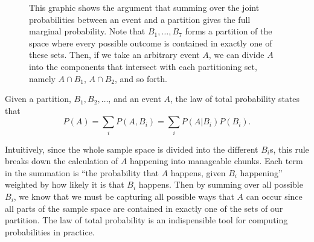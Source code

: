 \documentclass[
  letterpaper,
  DIV=11,
  numbers=noendperiod]{scrreprt}
\theoremstyle{definition}
\theoremstyle{definition}
\theoremstyle{definition}
\theoremstyle{remark}
\begin{document}
\begin{figure}[H]

\caption{\label{fig-basic-partition}This graphic shows the argument that
summing over the joint probabilities between an event and a partition
gives the full marginal probability. Note that \(B_1,\dots,B_7\) forms a
partition of the space where every possible outcome is contained in
exactly one of these sets. Then, if we take an arbitrary event \(A\), we
can divide \(A\) into the components that intersect with each
partitioning set, namely \(A \cap B_1\), \(A \cap B_2\), and so forth.}


\end{figure}%

\begin{tcolorbox}[enhanced jigsaw, rightrule=.15mm, leftrule=.75mm, opacitybacktitle=0.6, title={The Law of Total Probability}, colframe=quarto-callout-tip-color-frame, opacityback=0, coltitle=black, breakable, toptitle=1mm, colbacktitle=quarto-callout-tip-color!10!white, bottomtitle=1mm, titlerule=0mm, arc=.35mm, colback=white, toprule=.15mm, left=2mm, bottomrule=.15mm]

Given a partition, \(B_1, B_2, \dots\), and an event \(A\), the law of
total probability states that
\[P(A) = \sum_i P(A, B_i) = \sum_i P(A|B_i)P(B_i).\]

\end{tcolorbox}

Intuitively, since the whole sample space is divided into the different
\(B_i\)s, this rule breaks down the calculation of \(A\) happening into
manageable chunks. Each term in the summation is ``the probability that
\(A\) happens, given \(B_i\) happening'' weighted by how likely it is
that \(B_i\) happens. Then by summing over all possible \(B_i\), we know
that we must be capturing all possible ways that \(A\) can occur since
all parts of the sample space are contained in exactly one of the sets
of our partition. The law of total probability is an indispensible tool
for computing probabilities in practice.
\end{document}
